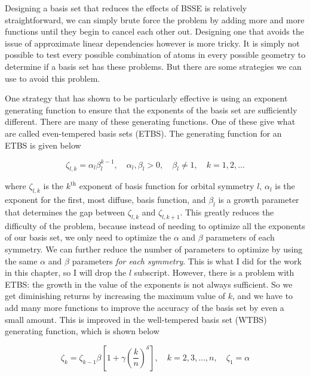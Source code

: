 Designing a basis set that reduces the effects of BSSE is relatively straightforward, we can simply brute force the problem by adding more and more functions until they begin to cancel each other out. Designing one that avoids the issue of approximate linear dependencies however is more tricky. It is simply not possible to test every possible combination of atoms in every possible geometry to determine if a basis set has these problems. But there are some strategies we can use to avoid this problem.

One strategy that has shown to be particularly effective is using an exponent generating function to ensure that the exponents of the basis set are sufficiently different. There are many of these generating functions. One of these give what are called even-tempered basis sets (ETBS)\cite{ETBS}. The generating function for an ETBS is given below

\begin{equation}
\label{eq:ETBS_gen}
\zeta_{l,k} = \alpha_{l}\beta^{k-1}_{l}, \quad \alpha_{l}, \beta_{l} > 0, \quad \beta_{l} \neq 1, \quad k = 1, 2, \ldots
\end{equation}

where $\zeta_{l,k}$ is the $k^{\text{th}}$ exponent of basis function for orbital symmetry $l$, $\alpha_{l}$ is the exponent for the first, most diffuse, basis function, and $\beta_{l}$ is a growth parameter that determines the gap between $\zeta_{l,k}$ and $\zeta_{l,k + 1}$. This greatly reduces the difficulty of the problem, because instead of needing to optimize all the exponents of our basis set, we only need to optimize the $\alpha$ and $\beta$ parameters of each symmetry. We can further reduce the number of parameters to optimize by using the same $\alpha$ and $\beta$ parameters \textit{for each symmetry}. This is what I did for the work in this chapter, so I will drop the $l$ subscript. However, there is a problem with ETBS: the growth in the value of the exponents is not always sufficient. So we get diminishing returns by increasing the maximum value of $k$, and we have to add many more functions to improve the accuracy of the basis set by even a small amount. This is improved in the well-tempered basis set (WTBS)\cite{WTBS} generating function, which is shown below

\begin{equation}
\label{eq:WTBS_gen}
\zeta_{k} = \zeta_{k-1}\beta\left[1+\gamma\left(\frac{k}{n}\right)^{\delta}\right], \quad k = 2, 3,\ldots, n, \quad \zeta_{1}=\alpha
\end{equation}

